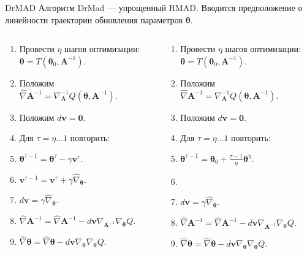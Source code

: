 \documentclass[10pt,pdf,utf8,russian,aspectratio=169]{beamer}
\begin{document}
\begin{frame}{DrMAD}
Алгоритм DrMad --- упрощенный RMAD. 
Вводится предположение о линейности траектории обновления параметров $\boldsymbol{\theta}$.
\begin{columns}
\begin{column}{0.5\textwidth}
\begin{enumerate}
\item Провести $\eta$ шагов оптимизации: $\boldsymbol{\theta} = T(\boldsymbol{\theta}_0, \mathbf{A}^{-1})$.
\item Положим $\hat{\nabla} \mathbf{A}^{-1} = \nabla_\mathbf{A}^{-1} Q(\boldsymbol{\theta}, \mathbf{A}^{-1}).$ 
\item Положим $d\mathbf{v} = \mathbf{0}.$
\item Для $\tau = \eta \dots 1 $ повторить:
\item $\boldsymbol{\theta}^{\tau-1} =  \boldsymbol{\theta}^{\tau} - \gamma\mathbf{v}^{\tau}.$
\item $\mathbf{v}^{\tau-1} =\mathbf{v}^{\tau} + \gamma \hat{\nabla}_{\boldsymbol{\theta}}.$
\item $d\mathbf{v} =  \gamma \hat{\nabla}_{\boldsymbol{\theta}}$.
\item $\hat{\nabla} \mathbf{A}^{-1} =  \hat{\nabla} \mathbf{A}^{-1} - d\mathbf{v}\nabla_{\mathbf{A}^{-1}} \nabla_{\boldsymbol{\theta}} Q$.
\item $\hat{\nabla} \boldsymbol{\theta}  = \hat{\nabla} \boldsymbol{\theta}  - d\mathbf{v}\nabla_{\boldsymbol{\theta}} \nabla_{\boldsymbol{\theta}} Q$.
\end{enumerate}
\end{column}
\begin{column}{0.5\textwidth}
\begin{enumerate}
\item Провести $\eta$ шагов оптимизации: $\boldsymbol{\theta} = T(\boldsymbol{\theta}_0, \mathbf{A}^{-1})$.
\item Положим $\hat{\nabla} \mathbf{A}^{-1} = \nabla_\mathbf{A}^{-1} Q(\boldsymbol{\theta}, \mathbf{A}^{-1}).$ 
\item Положим $d\mathbf{v} = \mathbf{0}.$
\item Для $\tau = \eta \dots 1 $ повторить:
\item $\boldsymbol{\theta}^{\tau-1} = \boldsymbol{\theta}_0 + \frac{\tau-1}{\eta} \boldsymbol{\theta}^{\eta}.$
\item ~
\item $d\mathbf{v} =  \gamma \hat{\nabla}_{\boldsymbol{\theta}}$.
\item $\hat{\nabla} \mathbf{A}^{-1} =  \hat{\nabla} \mathbf{A}^{-1} - d\mathbf{v}\nabla_{\mathbf{A}^{-1}} \nabla_{\boldsymbol{\theta}} Q$.
\item $\hat{\nabla} \boldsymbol{\theta}  = \hat{\nabla} \boldsymbol{\theta}  - d\mathbf{v}\nabla_{\boldsymbol{\theta}} \nabla_{\boldsymbol{\theta}} Q$.
\end{enumerate}
\end{column}
\end{columns}
\end{frame}
\end{document}

